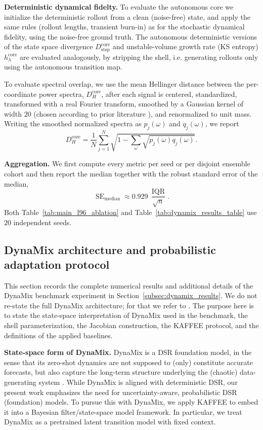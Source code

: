 \documentclass{article}
\theoremstyle{plain}
\theoremstyle{definition}
\theoremstyle{remark}
\begin{document}
\textbf{Deterministic dynamical fidelty.}
To evaluate the autonomous core we initialize the deterministic rollout from a clean (noise-free) state, and apply the same rules (rollout lengths, transient burn-in) as for the stochastic dynamical fidelity, using the noise-free ground truth. The autonomous deterministic versions of the state space divergence $D_\mathrm{stsp}^\mathrm{core}$ and unstable-volume growth rate (KS entropy) $h_{\lambda}^{\mathrm{core}}$ are evaluated analogously, by stripping the shell, i.e. generating rollouts only using the autonomous transition map.

To evaluate spectral overlap, we use the mean Hellinger distance between the per-coordinate power spectra, $D_H^{\mathrm{core}}$, after each signal is centered, standardized, transformed with a real Fourier transform, smoothed by a Gaussian kernel of width $20$ (chosen according to prior literature \citep{hess2023generalized,brenner2024almostlinear}), and renormalized to unit mass. Writing the smoothed normalized spectra as $p_j(\omega)$ and $q_j(\omega)$, we report
\[
D_H^{\mathrm{core}}
=
\frac{1}{N}\sum_{j=1}^{N}
\sqrt{1-\sum_{\omega}\sqrt{p_j(\omega)q_j(\omega)}}.
\]

\textbf{Aggregation.}
We first compute every metric per seed or per disjoint ensemble cohort and then report the median together with the robust standard error of the median,
\[
\operatorname{SE}_{\mathrm{median}}
\approx
0.929\,\frac{\operatorname{IQR}}{\sqrt{n}}.
\]
Both Table~\ref{tab:main_l96_ablation} and Table~\ref{tab:dynamix_results_table} use $20$ independent seeds.


\subsection{DynaMix architecture and probabilistic adaptation protocol}
\label{app:dynamix_practical_details}

This section records the complete numerical results and additional details of the DynaMix benchmark experiment in Section~\ref{subsec:dynamix_results}. We do not re-state the full DynaMix architecture; for that we refer to \citep{hemmer2025true}. The purpose here is to state the state-space interpretation of DynaMix used in the benchmark, the shell parameterization, the Jacobian construction, the KAFFEE protocol, and the definitions of the applied baselines.

\textbf{State-space form of DynaMix.} DynaMix is a DSR foundation model, in the sense that its zero-shot dynamics are not supposed to (only) constitute accurate forecasts, but also capture the long-term structure underlying the (chaotic) data-generating system \citep{hemmer2025true,durstewitz2026position}. While DynaMix is aligned with deterministic DSR, our present work emphasizes the need for uncertainty-aware, probabilistic DSR (foundation) models. To pursue this with DynaMix, we apply KAFFEE to embed it into a Bayesian filter/state-space model framework. In particular, we treat DynaMix as a pretrained latent transition model with fixed context.
\end{document}
